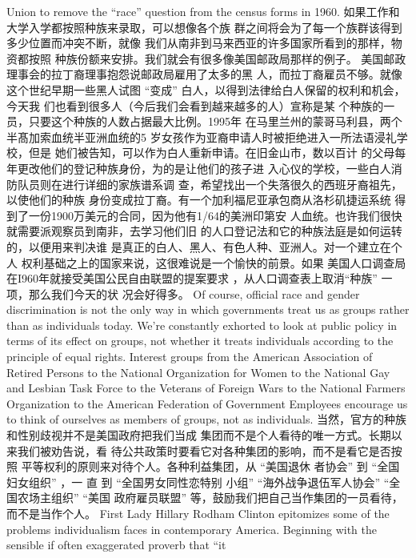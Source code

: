 \begin{paracol}{2}
Union to remove the ``race'' question from the census forms in
1960.
\switchcolumn
如果工作和大学入学都按照种族来录取，可以想像各个族
群之间将会为了每一个族群该得到多少位置而冲突不断，就像
我们从南非到马来西亚的许多国家所看到的那样，物资都按照
种族份额来安排。我们就会有很多像美国邮政局那样的例子。
美国邮政理事会的拉丁裔理事抱怨说邮政局雇用了太多的黑
人，而拉丁裔雇员不够。就像这个世纪早期一些黑人试图
“变成” 白人，以得到法律给白人保留的权利和机会，今天我
们也看到很多人（今后我们会看到越来越多的人）宣称是某
个种族的一员，只要这个种族的人数占据最大比例。1995年
在马里兰州的蒙哥马利县，两个半髙加索血统半亚洲血统的5
岁女孩作为亚裔申请人时被拒绝进入一所法语浸礼学校，但是
她们被告知，可以作为白人重新申请。在旧金山市，数以百计
的父母每年更改他们的登记种族身份，为的是让他们的孩子进
入心仪的学校，一些白人消防队员则在进行详细的家族谱系调
查，希望找出一个失落很久的西班牙裔祖先，以使他们的种族
身份变成拉丁裔。有一个加利福尼亚承包商从洛杉矶捷运系统
得到了一份1900万美元的合同，因为他有1/64的美洲印第安
人血统。也许我们很快就需要派观察员到南非，去学习他们旧
的人口登记法和它的种族法庭是如何运转的，以便用来判决谁
是真正的白人、黑人、有色人种、亚洲人。对一个建立在个人
权利基础之上的国家来说，这很难说是一个愉快的前景。如果
美国人口调查局在I960年就接受美国公民自由联盟的提案要求 ，从人口调查表上取消“种族” 一项，那么我们今天的状
况会好得多。
\switchcolumn*
Of course, official race and gender discrimination is not the
only way in which governments treat us as groups rather than
as individuals today. We're constantly exhorted to look at public policy in terms of its effect on groups, not whether it treats
individuals according to the principle of equal rights. Interest
groups from the American Association of Retired Persons to the
National Organization for Women to the National Gay and
Lesbian Task Force to the Veterans of Foreign Wars to the National Farmers Organization to the American Federation of
Government Employees encourage us to think of ourselves as
members of groups, not as individuals.
\switchcolumn
当然，官方的种族和性别歧视并不是美国政府把我们当成
集团而不是个人看待的唯一方式。长期以来我们被劝告说，看
待公共政策时要看它对各种集团的影响，而不是看它是否按照
平等权利的原则来对待个人。各种利益集团，从 “美国退休
者协会” 到 “全国妇女组织” ，一 直 到 “全国男女同性恋特别
小组” “海外战争退伍军人协会” “全国农场主组织” “美国
政府雇员联盟” 等，鼓励我们把自己当作集团的一员看待，
而不是当作个人。
\switchcolumn*
First Lady Hillary Rodham Clinton epitomizes some of the
problems individualism faces in contemporary America. Beginning with the sensible if often exaggerated proverb that ``it

\end{paracol}

